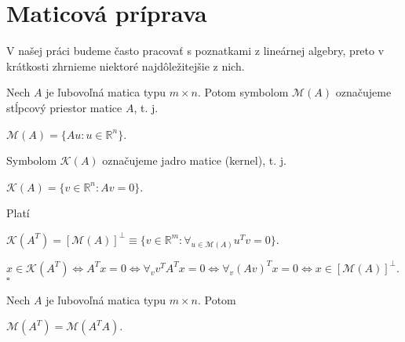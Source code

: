 \section{Maticová príprava}
\label{matrix algebra}

V našej práci budeme často pracovať s poznatkami z lineárnej algebry, preto v krátkosti zhrnieme niektoré najdôležitejšie z nich.

\begin{defin}
Nech $A$ je ľubovoľná matica typu $m \times n$. Potom symbolom $\mathcal{M}(A)$ označujeme stĺpcový priestor matice $A$, t. j.
\begin{center}
$
\mathcal{M}(A) = \{ Au : u \in \mathbb{R}^n \}
$.
\end{center}
Symbolom $\mathcal{K}(A)$ označujeme jadro matice (kernel), t. j.
\begin{center}
$
\mathcal{K}(A) = \{ v \in \mathbb{R}^n : Av = 0 \}
$.
\end{center}
\end{defin}

\begin{lema}
Platí
\begin{center}
$
\mathcal{K}(A^T) = [\mathcal{M}(A)]^{\perp} \equiv \{ v \in \mathbb{R}^m : {\forall}_{u \in \mathcal{M}(A)} u^T v = 0 \}
$.
\end{center}
\end{lema}

\begin{dokaz}


\begin{center}
$
x \in \mathcal{K}(A^T) \Leftrightarrow A^T x = 0 \Leftrightarrow {\forall}_v v^T A^T x = 0 \Leftrightarrow {\forall}_v (Av)^Tx = 0 \Leftrightarrow x \in [\mathcal{M}(A)]^{\perp}
$.
$\square$
\end{center}
\end{dokaz}

\begin{lema}
\label{o stlpcovych priestoroch}
Nech $A$ je ľubovoľná matica typu $m \times n$. Potom
\begin{center}
$\mathcal{M}(A^T) = \mathcal{M}(A^T A)$.
\end{center}
\end{lema}

